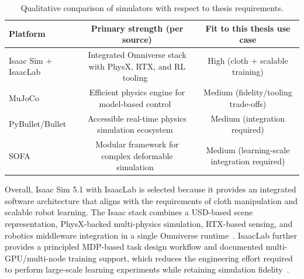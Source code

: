 \begin{table}[htb]
    \centering
    \caption{Qualitative comparison of simulators with respect to thesis requirements.}\label{tab:simulator_comparison}
    \begin{tabular}{l c c}
    \hline
    \textbf{Platform} & \textbf{Primary strength (per source)} & \textbf{Fit to this thesis use case} \\
    \hline
    Isaac Sim + IsaacLab & Integrated Omniverse stack with PhysX, RTX, and \ac{RL} tooling~\cite{nvidia_isaac_sim_510_what_is,Mittal2025IsaacLab} & High (cloth + scalable training) \\
    MuJoCo & Efficient physics engine for model-based control~\cite{Todorov2012MuJoCo} & Medium (fidelity/tooling trade-offs) \\
    PyBullet/Bullet & Accessible real-time physics simulation ecosystem~\cite{pybullet_homepage,Coumans2015Bullet} & Medium (integration required) \\
    SOFA & Modular framework for complex deformable simulation~\cite{Allard2007SOFA} & Medium (learning-scale integration required) \\
    \hline
    \end{tabular}
\end{table}

Overall, Isaac Sim 5.1 with IsaacLab is selected because it provides an integrated software architecture that aligns with the requirements of cloth manipulation and scalable robot learning. The Isaac stack combines a \ac{USD}-based scene representation, PhysX-backed multi-physics simulation, RTX-based sensing, and robotics middleware integration in a single Omniverse runtime~\cite{nvidia_isaac_sim_510_what_is,nvidia_isaac_sim_510_extensions_api}. IsaacLab further provides a principled \ac{MDP}-based task design workflow and documented multi-\ac{GPU}/multi-node training support, which reduces the engineering effort required to perform large-scale learning experiments while retaining simulation fidelity~\cite{isaaclab_manager_based_rl_env,isaaclab_multi_gpu_multinode,Mittal2025IsaacLab}.

